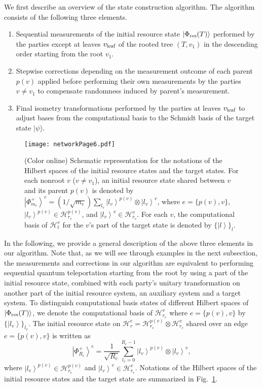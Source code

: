 \documentclass[preprintnumbers,aps,amsmath,amssymb,pra,twocolumn,showpacs,superscriptaddress,floatfix]{revtex4-1}
\def\Ket#1{\left|#1\right\rangle}
\newcommand{\ket}[1]{|{#1}\rangle}
\theoremstyle{plain}
\theoremstyle{definition}
\theoremstyle{remark}
\begin{document}
We first describe an overview of the state construction algorithm.  The algorithm consists of the following three elements.
\begin{enumerate}
\item Sequential measurements of the initial resource state $\ket{\Phi_{\textup{res}}(T)}$ performed by the parties except at leaves $v_{\textup{leaf}}$ of the rooted tree $(T,v_1)$ in the descending order starting from the root $v_1$.
\item Stepwise corrections depending on the measurement outcome of each parent $p(v)$ applied before performing their own measurements by the parties $v \neq v_1$ to compensate randomness induced by parent's measurement.
\item Final isometry transformations performed by the parties at leaves $v_{\textup{leaf}}$ to adjust bases from the computational basis to the Schmidt basis of the target state $\ket{\psi}$.
\end{enumerate}

\begin{figure}
\centering
\texttt{[image: networkPage6.pdf]}
\caption{(Color online) Schematic representation for the notations of the Hilbert spaces of the initial resource states and the target states.
    For each nonroot $v$ ($v\neq v_1$), an initial resource state shared between $v$ and its parent $p(v)$ is denoted by $\Ket{\Phi^+_{m_e}}^e=\left(1/\sqrt{m_e}\right)\sum_{l_v}\Ket{l_v}^{p(v)}\otimes\Ket{l_v}^v$, where $e=\{p(v),v\}$, $\Ket{l_v}^{p(v)}\in\mathcal{H}^{p(v)}_{r_e}$, and $\Ket{l_v}^v\in\mathcal{H}^v_{r_e}$.
    For each $v$, the computational basis of $\mathcal{H}^v_t$ for the $v$'s part of the target state is denoted by ${\{\Ket{l}\}}_l$.
}
\label{fig:system}
\end{figure}


In the following, we provide a general description of the above three elements in our algorithm.
Note that, as we will see through examples in the next subsection, the measurements and corrections in our algorithm are equivalent to performing sequential quantum teleportation starting from the root by using a part of the initial resource state, combined with each party's unitary transformation on another part of the initial resource system, an auxiliary system and a target system.
To distinguish computational basis states of different Hilbert spaces of $\ket{\Phi_{\textup{res}}(T)}$, we denote the computational basis of $\mathcal{H}^v_{r_e}$ where $e=\{p(v),v\}$ by ${\{\Ket{l_v}\}}_{l_v}$.     The initial resource state on $\mathcal{H}^e_r=\mathcal{H}^{p(v)}_{r_e}\otimes\mathcal{H}^v_{r_e}$ shared over an edge $e=\{p(v),v\}$ is written as
\[
    \Ket{\Phi^+_{R_e}}^e=\frac{1}{\sqrt{R_e}}\sum_{l_v=0}^{R_e-1}\Ket{l_v}^{p(v)}\otimes\Ket{l_v}^v,
\]
where $\Ket{l_v}^{p(v)}\in \mathcal{H}^{p(v)}_{r_e}$ and $\Ket{l_v}^v\in\mathcal{H}^v_{r_e}$.
Notations of the Hilbert spaces of the initial resource states and the target state are summarized in Fig.~\ref{fig:system}.
\end{document}
